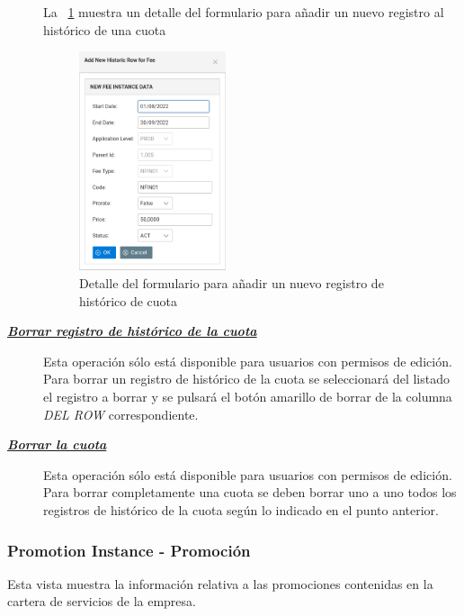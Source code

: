 \begin{description}
La \figurename~\ref{fig:nuevo-historico-cuota} muestra un detalle del formulario para añadir un nuevo registro al histórico de una cuota

\begin{figure}
  \centering
  \includegraphics[width=0.425\textwidth]{imaxes/nuevo-historico-cuota.png}
  \caption{Detalle del formulario para añadir un nuevo registro de histórico de cuota}
  \label{fig:nuevo-historico-cuota}
\end{figure}



\item[\underline{\textsl{\textbf{Borrar registro de histórico de la cuota}}}] Esta operación sólo está disponible para usuarios con permisos de edición.
Para borrar un registro de histórico de la cuota se seleccionará del listado el registro a borrar y se pulsará el botón amarillo de borrar de la columna \textit{DEL ROW} correspondiente.

\item[\underline{\textsl{\textbf{Borrar la cuota}}}] Esta operación sólo está disponible para usuarios con permisos de edición.
Para borrar completamente una cuota se deben borrar uno a uno todos los registros de histórico de la cuota según lo indicado en el punto anterior. 
\end{description}



\subsubsection{Promotion Instance - Promoción}
\label{sub:promotion}

Esta vista muestra la información relativa a las promociones contenidas en la cartera de servicios de la empresa.

